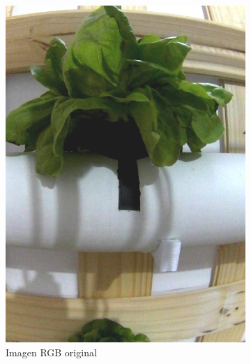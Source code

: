 \begin{figure}[H]
\centering
\begin{subfigure}[b]{0.48\textwidth}
    \centering
    \includegraphics[width=\textwidth]{imagenes/clasificador_1_original.jpg}
    \caption{Imagen RGB original}
\end{subfigure}
\hfill
\begin{subfigure}[b]{0.48\textwidth}
    \centering

\end{subfigure}
\end{figure}
